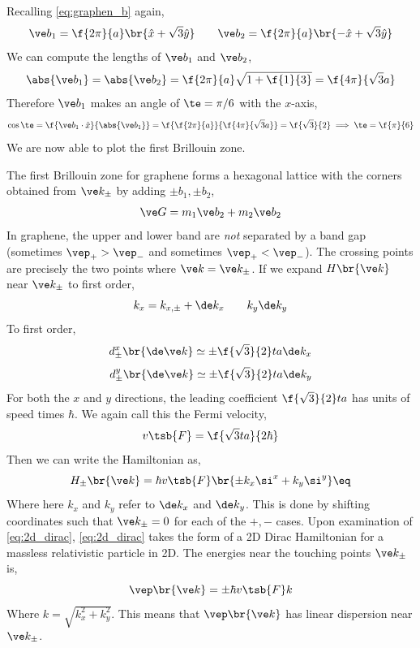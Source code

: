 \documentclass{article}
\begin{document}
Recalling \cref{eq:graphen_b} again,
\[ \ve b_{1} = \f{2 \pi}{a} \br{\hat x + \sqrt{3} \hat y} \qquad \ve b_{2} = \f{2 \pi}{a} \br{-\hat x + \sqrt{3} \hat y}\]
We can compute the lengths of $\ve b_1$ and $\ve b_2$,
\[ \abs{\ve b_1} = \abs{\ve b_2} = \f{2 \pi}{a} \sqrt{1 + \f{1}{3}} = \f{4\pi}{\sqrt{3} a} \]
Therefore $\ve b_1$ makes an angle of $\te = \pi/6$ with the $x$-axis,
\[ \cos\te = \f{\ve b_1 \cdot \hat x}{\abs{\ve b_1}} = \f{\f{2 \pi}{a}}{\f{4 \pi}{\sqrt{3}a}} = \f{\sqrt{3}}{2} \implies \te = \f{\pi}{6} \]
We are now able to plot the first Brillouin zone.
\begin{center}
\end{center}
The first Brillouin zone for graphene forms a hexagonal lattice with the corners obtained from $\ve k_{\pm}$ by adding $\pm b_1, \pm b_2$,
\[ \ve G = m_1 \ve b_2 + m_2 \ve b_2 \]
In graphene, the upper and lower band are \textit{not} separated by a band gap (sometimes $\vep_{+} > \vep_{-}$ and sometimes $\vep_{+} < \vep_{-}$). The crossing points are precisely the two points where $\ve k = \ve k_{\pm}$. If we expand $H\br{\ve k}$ near $\ve k_{\pm}$ to first order,
\[ k_x = k_{x, \pm} + \de k_x  \qquad k_y \de k_y\]
To first order,
\[ d^{x}_{\pm} \br{\de \ve k} \simeq \pm \f{\sqrt{3}}{2} t a \de k_x \]
\[ d^{y}_{\pm} \br{\de \ve k} \simeq \pm \f{\sqrt{3}}{2} t a \de k_y \]
For both the $x$ and $y$ directions, the leading coefficient $\f{\sqrt{3}}{2} t a$ has units of speed times $\hbar$. We again call this the Fermi velocity,
\[ v\tsb{F} = \f{\sqrt{3} t a}{2\hbar} \]
Then we can write the Hamiltonian as,
\[ H_{\pm}\br{\ve k} = \hbar v\tsb{F} \br{\pm k_x \si^x + k_y \si^{y}} \eq \label{eq:2d_dirac}\]
Where here $k_x$ and $k_y$ refer to $\de k_x$ and $\de k_y$. This is done by shifting coordinates such that $\ve k_{\pm} = 0$ for each of the $+, -$ cases. Upon examination of \cref{eq:2d_dirac}, \cref{eq:2d_dirac} takes the form of a 2D Dirac Hamiltonian for a massless relativistic particle in 2D. The energies near the touching points $\ve k_{\pm}$ is,
\[ \vep\br{\ve k} = \pm \hbar v\tsb{F} k \]
Where $k = \sqrt{k_x^2 + k_y^2}$. This means that $\vep\br{\ve k}$ has linear dispersion near $\ve k_{\pm}$. \\
\end{document}
